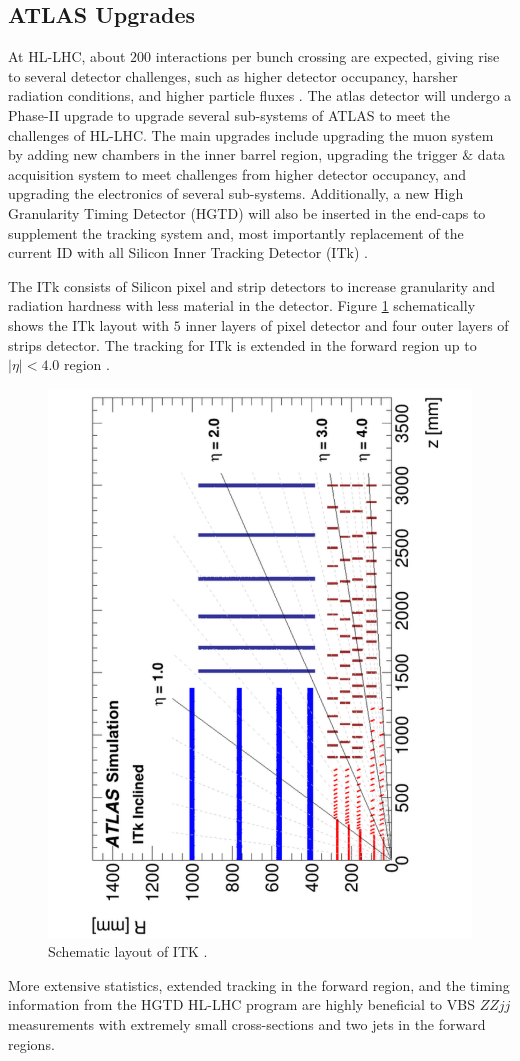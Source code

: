 \subsection{ATLAS Upgrades}
\label{subsec:ATLASUpgrade}
At HL-LHC, about $200$ interactions per bunch crossing are expected, giving rise to several detector challenges, such as higher detector occupancy, harsher radiation conditions, and higher particle fluxes \cite{HLLHC}. The atlas detector will undergo a Phase-II upgrade to upgrade several sub-systems of ATLAS to meet the challenges of HL-LHC. The main upgrades include upgrading the muon system by adding new chambers in the inner barrel region, upgrading the trigger $\&$ data acquisition system to meet challenges from higher detector occupancy, and upgrading the electronics of several sub-systems. Additionally, a new High Granularity Timing Detector (HGTD) will also be inserted in the end-caps to supplement the tracking system and, most importantly replacement of the current ID with all Silicon Inner Tracking Detector (ITk) \cite{HLLHC}.

The ITk consists of Silicon pixel and strip detectors to increase granularity and radiation hardness with less material in the detector. Figure \ref{fig:ITKLayout} schematically shows the ITk layout with $5$ inner layers of pixel detector and four outer layers of strips detector. The tracking for ITk is extended in the forward region up to $|\eta| < 4.0$ region \cite{ITkStripsTDR}. 

\begin{figure}
    \centering
    \includegraphics[angle=270,width=.95\linewidth]{figures/LHC/ITKLayout.pdf}
    \caption{ Schematic layout of ITK \cite{ITkPixelTDR}.\label{fig:ITKLayout}}
\end{figure}

More extensive statistics, extended tracking in the forward region, and the timing information from the HGTD HL-LHC program are highly beneficial to VBS $ZZjj$ measurements with extremely small cross-sections and two jets in the forward regions. 